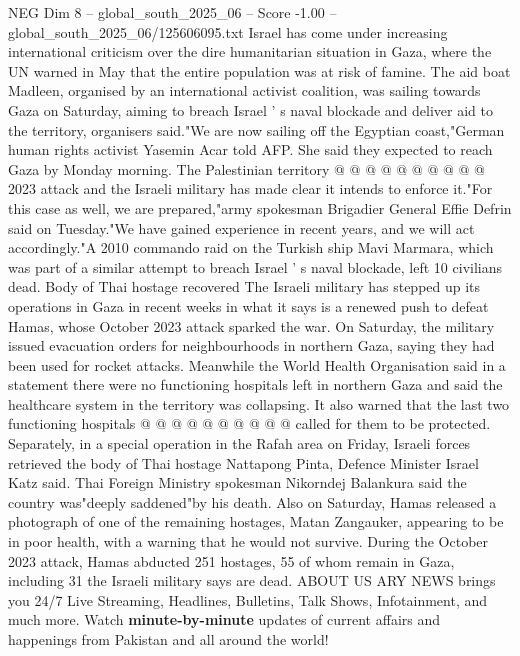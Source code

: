 \begin{textsample}{NEG Dim 8 – global\_south\_2025\_06 – Score -1.00 – global\_south\_2025\_06/125606095.txt}
Israel has come under increasing international criticism over the dire humanitarian situation in Gaza, where the UN warned in May that the entire population was at risk of famine.
The aid boat Madleen, organised by an international activist coalition, was sailing towards Gaza on Saturday, aiming to breach Israel ' s naval blockade and deliver aid to the territory, organisers said."We are now sailing off the Egyptian coast,"German human rights activist Yasemin Acar told AFP.
She said they expected to reach Gaza by Monday morning.
The Palestinian territory @ @ @ @ @ @ @ @ @ @ 2023 attack and the Israeli military has made clear it intends to enforce it."For this case as well, we are prepared,"army spokesman Brigadier General Effie Defrin said on Tuesday."We have gained experience in recent years, and we will act accordingly."A 2010 commando raid on the Turkish ship Mavi Marmara, which was part of a similar attempt to breach Israel ' s naval blockade, left 10 civilians dead.
Body of Thai hostage recovered The Israeli military has stepped up its operations in Gaza in recent weeks in what it says is a renewed push to defeat Hamas, whose October 2023 attack sparked the war.
On Saturday, the military issued evacuation orders for neighbourhoods in northern Gaza, saying they had been used for rocket attacks.
Meanwhile the World Health Organisation said in a statement there were no functioning hospitals left in northern Gaza and said the healthcare system in the territory was collapsing.
It also warned that the last two functioning hospitals @ @ @ @ @ @ @ @ @ @ called for them to be protected.
Separately, in a special operation in the Rafah area on Friday, Israeli forces retrieved the body of Thai hostage Nattapong Pinta, Defence Minister Israel Katz said.
Thai Foreign Ministry spokesman Nikorndej Balankura said the country was"deeply saddened"by his death.
Also on Saturday, Hamas released a photograph of one of the remaining hostages, Matan Zangauker, appearing to be in poor health, with a warning that he would not survive.
During the October 2023 attack, Hamas abducted 251 hostages, 55 of whom remain in Gaza, including 31 the Israeli military says are dead.
ABOUT US ARY NEWS brings you 24/7 Live Streaming, Headlines, Bulletins, Talk Shows, Infotainment, and much more.
Watch \textbf{minute-by-minute} updates of current affairs and happenings from Pakistan and all around the world!

\end{textsample}
